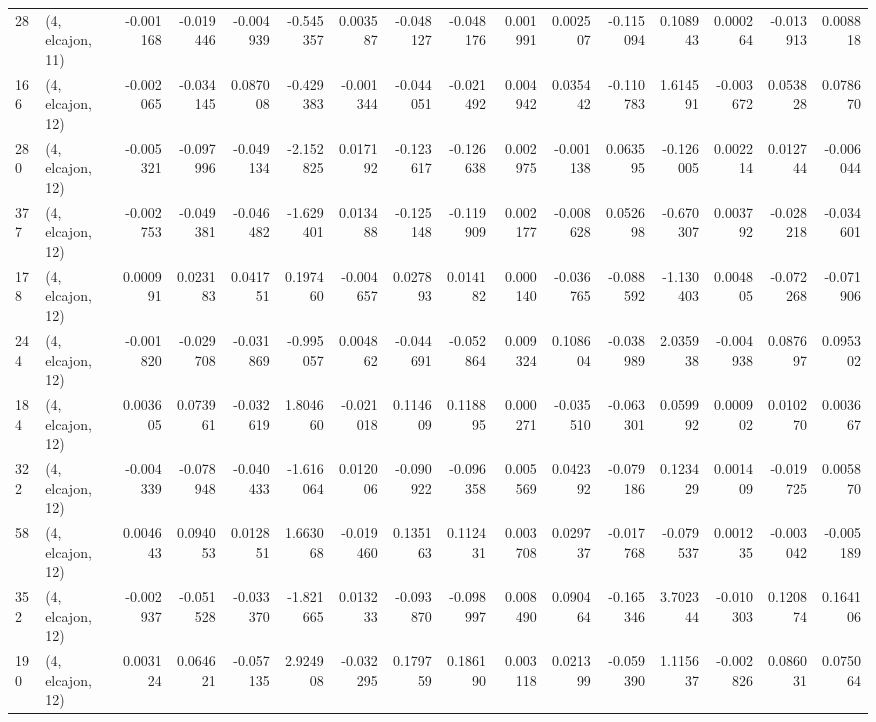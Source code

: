 \begin{tabular}{llrrrrrrrrrrrrrr}
28  &  (4, elcajon, 11) &  -0.001168 & -0.019446 & -0.004939 &   -0.545357 &  0.003587 &  -0.048127 & -0.048176 &  0.001991 &  0.002507 & -0.115094 &    0.108943 &  0.000264 & -0.013913 &  0.008818 \\
166 &  (4, elcajon, 12) &  -0.002065 & -0.034145 &  0.087008 &   -0.429383 & -0.001344 &  -0.044051 & -0.021492 &  0.004942 &  0.035442 & -0.110783 &    1.614591 & -0.003672 &  0.053828 &  0.078670 \\
280 &  (4, elcajon, 12) &  -0.005321 & -0.097996 & -0.049134 &   -2.152825 &  0.017192 &  -0.123617 & -0.126638 &  0.002975 & -0.001138 &  0.063595 &   -0.126005 &  0.002214 &  0.012744 & -0.006044 \\
377 &  (4, elcajon, 12) &  -0.002753 & -0.049381 & -0.046482 &   -1.629401 &  0.013488 &  -0.125148 & -0.119909 &  0.002177 & -0.008628 &  0.052698 &   -0.670307 &  0.003792 & -0.028218 & -0.034601 \\
178 &  (4, elcajon, 12) &   0.000991 &  0.023183 &  0.041751 &    0.197460 & -0.004657 &   0.027893 &  0.014182 &  0.000140 & -0.036765 & -0.088592 &   -1.130403 &  0.004805 & -0.072268 & -0.071906 \\
244 &  (4, elcajon, 12) &  -0.001820 & -0.029708 & -0.031869 &   -0.995057 &  0.004862 &  -0.044691 & -0.052864 &  0.009324 &  0.108604 & -0.038989 &    2.035938 & -0.004938 &  0.087697 &  0.095302 \\
184 &  (4, elcajon, 12) &   0.003605 &  0.073961 & -0.032619 &    1.804660 & -0.021018 &   0.114609 &  0.118895 &  0.000271 & -0.035510 & -0.063301 &    0.059992 &  0.000902 &  0.010270 &  0.003667 \\
322 &  (4, elcajon, 12) &  -0.004339 & -0.078948 & -0.040433 &   -1.616064 &  0.012006 &  -0.090922 & -0.096358 &  0.005569 &  0.042392 & -0.079186 &    0.123429 &  0.001409 & -0.019725 &  0.005870 \\
58  &  (4, elcajon, 12) &   0.004643 &  0.094053 &  0.012851 &    1.663068 & -0.019460 &   0.135163 &  0.112431 &  0.003708 &  0.029737 & -0.017768 &   -0.079537 &  0.001235 & -0.003042 & -0.005189 \\
352 &  (4, elcajon, 12) &  -0.002937 & -0.051528 & -0.033370 &   -1.821665 &  0.013233 &  -0.093870 & -0.098997 &  0.008490 &  0.090464 & -0.165346 &    3.702344 & -0.010303 &  0.120874 &  0.164106 \\
190 &  (4, elcajon, 12) &   0.003124 &  0.064621 & -0.057135 &    2.924908 & -0.032295 &   0.179759 &  0.186190 &  0.003118 &  0.021399 & -0.059390 &    1.115637 & -0.002826 &  0.086031 &  0.075064 \\

\end{tabular}
